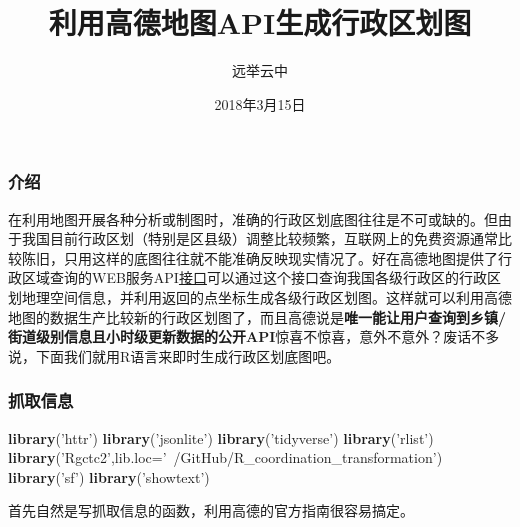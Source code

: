 \documentclass[]{article}
\title{利用高德地图API生成行政区划图}
\author{远举云中}
\date{2018年3月15日}
\newenvironment{Shaded}{\begin{snugshade}}{\end{snugshade}}
\newcommand{\DataTypeTok}[1]{\textcolor[rgb]{0.13,0.29,0.53}{#1}}
\newcommand{\KeywordTok}[1]{\textcolor[rgb]{0.13,0.29,0.53}{\textbf{#1}}}
\newcommand{\NormalTok}[1]{#1}
\newcommand{\StringTok}[1]{\textcolor[rgb]{0.31,0.60,0.02}{#1}}
\begin{document}
\maketitle

\subsubsection{介绍}

在利用地图开展各种分析或制图时，准确的行政区划底图往往是不可或缺的。但由于我国目前行政区划（特别是区县级）调整比较频繁，互联网上的免费资源通常比较陈旧，只用这样的底图往往就不能准确反映现实情况了。好在高德地图提供了行政区域查询的WEB服务API\href{http://lbs.amap.com/api/webservice/guide/api/district/}{接口}可以通过这个接口查询我国各级行政区的行政区划地理空间信息，并利用返回的点坐标生成各级行政区划图。这样就可以利用高德地图的数据生产比较新的行政区划图了，而且高德说是\textbf{唯一能让用户查询到乡镇/街道级别信息且小时级更新数据的公开API}惊喜不惊喜，意外不意外？废话不多说，下面我们就用R语言来即时生成行政区划底图吧。

\subsubsection{抓取信息}

\begin{Shaded}
\begin{Highlighting}[]
\KeywordTok{library}\NormalTok{(}\StringTok{'httr'}\NormalTok{)}
\KeywordTok{library}\NormalTok{(}\StringTok{'jsonlite'}\NormalTok{)}
\KeywordTok{library}\NormalTok{(}\StringTok{'tidyverse'}\NormalTok{)}
\KeywordTok{library}\NormalTok{(}\StringTok{'rlist'}\NormalTok{)}
\KeywordTok{library}\NormalTok{(}\StringTok{'Rgctc2'}\NormalTok{,}\DataTypeTok{lib.loc=}\StringTok{'~/GitHub/R_coordination_transformation'}\NormalTok{)}
\KeywordTok{library}\NormalTok{(}\StringTok{'sf'}\NormalTok{)}
\KeywordTok{library}\NormalTok{(}\StringTok{'showtext'}\NormalTok{)}
\end{Highlighting}
\end{Shaded}

首先自然是写抓取信息的函数，利用高德的官方指南很容易搞定。
\end{document}
